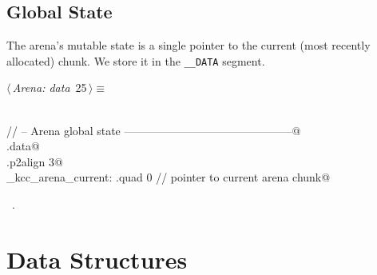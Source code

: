 \documentclass[11pt,a4paper,twoside,openright,DIV=15]{scrbook}
\theoremstyle{definition}
\theoremstyle{plain}
\theoremstyle{remark}
\begin{document}
\section{Global State}

The arena's mutable state is a single pointer to the current (most
recently allocated) chunk.  We store it in the \texttt{\_\_DATA} segment.

\begin{flushleft} \small
\begin{minipage}{\linewidth}\label{scrap17}\raggedright\small
{} $\langle\,${\itshape Arena: data}\nobreak\ {\footnotesize {25}}$\,\rangle\equiv$
\vspace{-1ex}
\begin{list}{}{} \item
\mbox{}\verb@@\\
\mbox{}\verb@// -- Arena global state ---------------------------------------------@\\
\mbox{}\verb@.data@\\
\mbox{}\verb@.p2align 3@\\
\mbox{}\verb@_kcc_arena_current: .quad 0   // pointer to current arena chunk@\\
\mbox{}\verb@@{\NWsep}
\end{list}
\vspace{-1.5ex}
\footnotesize
\begin{list}{}{\setlength{\itemsep}{-\parsep}\setlength{\itemindent}{-\leftmargin}}
\item \NWtxtMacroRefIn\ .

\item{}
\end{list}
\end{minipage}\vspace{4ex}
\end{flushleft}
%
%

\chapter{Data Structures}
\label{ch:data-structures}
\end{document}
